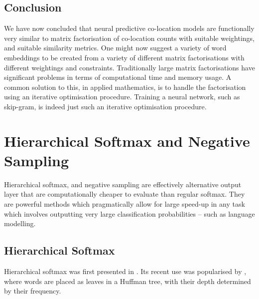 \documentclass[parskip]{komatufte}
\begin{document}
\subsection{Conclusion}
We have now concluded that neural predictive co-location models are functionally very similar to matrix factorisation of co-location counts with suitable weightings, and suitable similarity metrics.
One might now suggest a variety of word embeddings to be created from a variety of different matrix factorisations with different weightings and constraints.
Traditionally large matrix factorisations have significant problems in terms of computational time and memory usage.
A common solution to this, in applied mathematics, is to handle the factorisation using an iterative optimisation procedure.
Training a neural network, such as skip-gram, is indeed just such an iterative optimisation procedure.




\section{Hierarchical Softmax and Negative Sampling}\label{sec:hierachical-softmax-and-negative-sampling}
Hierarchical softmax, and negative sampling are effectively alternative output layer that are computationally cheaper to evaluate than regular softmax.
They are powerful methods which pragmatically allow for large speed-up in any task which involves outputting very large classification probabilities -- such as language modelling.


\subsection{Hierarchical Softmax}\label{sec:hierarchical-softmax}
Hierarchical softmax was first presented in  .
Its recent use was popularised by , where words are placed as leaves in a Huffman tree, with their depth determined by their frequency.


\end{document}
